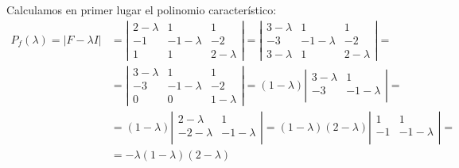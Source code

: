 \documentclass[12pt]{article}
\begin{document}
\begin{ejercicio} 
\begin{enumerate}
        Calculamos en primer lugar el polinomio característico:
        \begin{equation*}\begin{split}
            P_f(\lambda) = |F-\lambda I| &= \left|\begin{array}{ccc}
                2-\lambda & 1 & 1 \\
                -1 & -1-\lambda & -2 \\
                1 & 1 & 2-\lambda
            \end{array}\right|
            =
            \left|\begin{array}{ccc}
                3-\lambda & 1 & 1 \\
                -3 & -1-\lambda & -2 \\
                3-\lambda & 1 & 2-\lambda
            \end{array}\right|=\\
            &=
            \left|\begin{array}{ccc}
                3-\lambda & 1 & 1 \\
                -3 & -1-\lambda & -2 \\
                0 & 0 & 1-\lambda
            \end{array}\right|
            = (1-\lambda)\left|\begin{array}{cc}
                3-\lambda & 1 \\
                -3 & -1-\lambda \\
            \end{array}\right|
            =\\&= (1-\lambda)\left|\begin{array}{cc}
                2-\lambda & 1 \\
                -2-\lambda & -1-\lambda \\
            \end{array}\right|
            = (1-\lambda)(2-\lambda)\left|\begin{array}{cc}
                1 & 1 \\
                -1 & -1-\lambda \\
            \end{array}\right|
            =\\&= -\lambda(1-\lambda)(2-\lambda)
        \end{split}\end{equation*}


\end{enumerate}
\end{ejercicio}
\end{document}
